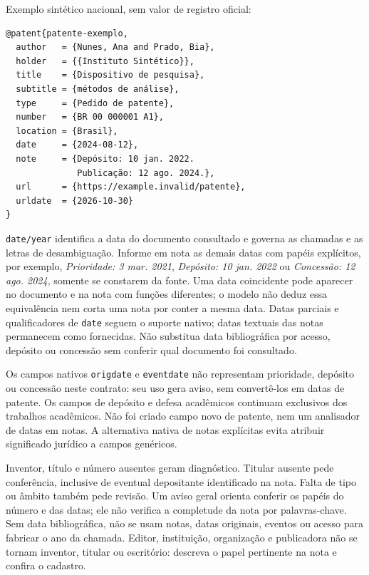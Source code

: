\begin{samepage}
Exemplo sintético nacional, sem valor de registro oficial:
\begin{verbatim}
@patent{patente-exemplo,
  author   = {Nunes, Ana and Prado, Bia},
  holder   = {{Instituto Sintético}},
  title    = {Dispositivo de pesquisa},
  subtitle = {métodos de análise},
  type     = {Pedido de patente},
  number   = {BR 00 000001 A1},
  location = {Brasil},
  date     = {2024-08-12},
  note     = {Depósito: 10 jan. 2022.
              Publicação: 12 ago. 2024.},
  url      = {https://example.invalid/patente},
  urldate  = {2026-10-30}
}
\end{verbatim}
\end{samepage}

\texttt{date/year} identifica a data do documento consultado e governa as
chamadas e as letras de desambiguação. Informe em nota as demais datas com
papéis explícitos, por exemplo, \emph{Prioridade: 3 mar. 2021},
\emph{Depósito: 10 jan. 2022} ou \emph{Concessão: 12 ago. 2024}, somente
se constarem da fonte. Uma data coincidente pode aparecer no documento e na
nota com funções diferentes; o modelo não deduz essa equivalência nem corta
uma nota por conter a mesma data. Datas parciais e qualificadores de
\texttt{date} seguem o suporte nativo; datas textuais das notas permanecem
como fornecidas. Não substitua data bibliográfica por acesso, depósito ou
concessão sem conferir qual documento foi consultado.

Os campos nativos \texttt{origdate} e \texttt{eventdate} não representam
prioridade, depósito ou concessão neste contrato: seu uso gera aviso, sem
convertê-los em datas de patente. Os campos de depósito e defesa acadêmicos
continuam exclusivos dos trabalhos acadêmicos. Não foi criado campo novo de
patente, nem um analisador de datas em notas. A alternativa nativa de notas
explícitas evita atribuir significado jurídico a campos genéricos.

Inventor, título e número ausentes geram diagnóstico. Titular ausente pede
conferência, inclusive de eventual depositante identificado na nota. Falta de
tipo ou âmbito também pede revisão. Um aviso geral orienta conferir os papéis
do número e das datas; ele não verifica a completude da nota por palavras-chave.
Sem data bibliográfica, não se usam notas, datas originais, eventos ou acesso
para fabricar o ano da chamada. Editor, instituição, organização e publicadora
não se tornam inventor, titular ou escritório: descreva o papel pertinente
na nota e confira o cadastro.

